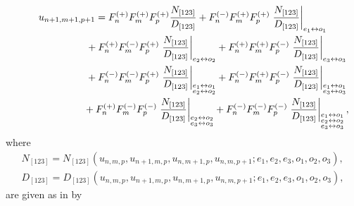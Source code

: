 \documentclass[pdftex]{sigma}
\numberwithin{equation}{section}
\begin{document}
\begin{gather}
 u_{n+1,m+1,p+1} =F^{(+)}_{n}F^{(+)}_{m}F^{(+)}_{p}\frac{N_{[123]}}{D_{[123]}}
 +F^{(-)}_{n}F^{(+)}_{m}F^{(+)}_{p}\left.\frac{N_{[123]}}{D_{[123]}}\right|_{e_1 \leftrightarrow o_1}
 \nonumber\\
\hphantom{u_{n+1,m+1,p+1} =}{} +F^{(+)}_{n}F^{(-)}_{m}F^{(+)}_{p}\left.\frac{N_{[123]}}{D_{[123]}}\right|_{e_2 \leftrightarrow o_2}
 +F^{(+)}_{n}F^{(+)}_{m}F^{(-)}_{p}\left.\frac{N_{[123]}}{D_{[123]}}\right|_{e_3 \leftrightarrow o_3}
 \nonumber\\
\hphantom{u_{n+1,m+1,p+1} =}{}+F^{(-)}_{n}F^{(-)}_{m}F^{(+)}_{p}\left.\frac{N_{[123]}}{D_{[123]}}
 \right|_{\substack{e_1 \leftrightarrow o_1\\e_2 \leftrightarrow o_2}}
 +F^{(-)}_{n}F^{(+)}_{m}F^{(-)}_{p}\left.\frac{N_{[123]}}{D_{[123]}}
 \right|_{\substack{e_1 \leftrightarrow o_1\\e_3 \leftrightarrow o_3}}
 \nonumber\\
\hphantom{u_{n+1,m+1,p+1} =}{}+F^{(+)}_{n}F^{(-)}_{m}F^{(-)}_{p}\left.\frac{N_{[123]}}{D_{[123]}}
 \right|_{\substack{e_2 \leftrightarrow o_2\\e_3 \leftrightarrow o_3}}
 +F^{(-)}_{n}F^{(-)}_{m}F^{(-)}_{p}\left.\frac{N_{[123]}}{D_{[123]}}
 \right|_{\substack{e_1 \leftrightarrow o_1\\e_2 \leftrightarrow o_2\\e_3 \leftrightarrow o_3}}, \label{eq:j1naunpmppp}
\end{gather}
where
 \begin{gather*}
 N_{[123]}= N_{[123]}( u_{n,m,p},u_{n+1,m,p},u_{n,m+1,p},u_{n,m,p+1};e_{1},e_{2},e_{3},o_{1},o_{2},o_{3} ), \label{eq:N123dep} \\
 D_{[123]}= D_{[123]}( u_{n,m,p},u_{n+1,m,p},u_{n,m+1,p},u_{n,m,p+1};e_{1},e_{2},e_{3},o_{1},o_{2},o_{3} ), \label{eq:D123dep}
 \end{gather*}
are given as in \cite{Hietarinta2004} by
\end{document}
